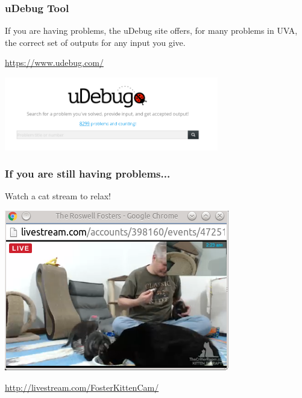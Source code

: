 \documentclass{beamer}
\begin{document}
\begin{frame}
  \frametitle{uDebug Tool}

  If you are having problems, the uDebug site offers, for many
  problems in UVA, the correct set of outputs for any input you give.

  \bigskip

  \url{https://www.udebug.com/}

  \bigskip

  \begin{center}
    \includegraphics[width=0.7\textwidth]{../img/udebug}
  \end{center}
\end{frame}

\begin{frame}
  \frametitle{If you are still having problems...}

  Watch a cat stream to relax!

  \bigskip

  \begin{center}
    \includegraphics[width=.6\textwidth]{../img/catstream}
  \end{center}

  \bigskip

  \url{http://livestream.com/FosterKittenCam/}
\end{frame}
\end{document}
